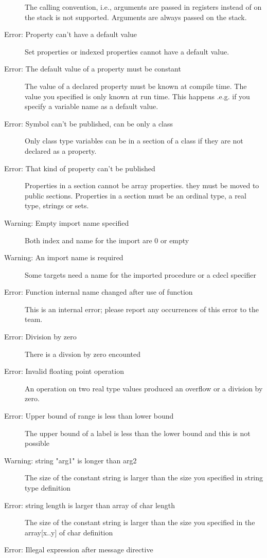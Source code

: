 \begin{description}
 The  calling convention, i.e., arguments are passed in
 registers instead of on the stack is not supported. Arguments are always
 passed on the stack.
\item [Error: Property can't have a default value]
 Set properties or indexed properties cannot have a default value.
\item [Error: The default value of a property must be constant]
 The value of a  declared property must be known at compile
 time. The value you specified is only known at run time. This happens
 .e.g. if you specify a variable name as a default value.
\item [Error: Symbol can't be published, can be only a class]
 Only class type variables can be in a  section of a class
 if they are not declared as a property.
\item [Error: That kind of property can't be published]
 Properties in a  section cannot be array properties.
 they must be moved to public sections. Properties in a 
 section must be an ordinal type, a real type, strings or sets.
\item [Warning: Empty import name specified]
 Both index and name for the import are 0 or empty
\item [Warning: An import name is required]
 Some targets need a name for the imported procedure or a cdecl specifier
\item [Error: Function internal name changed after use of function]
 This is an internal error; please report any occurrences of this error
 to the \fpc team.
\item [Error: Division by zero]
 There is a divsion by zero encounted
\item [Error: Invalid floating point operation]
 An operation on two real type values produced an overflow or a division
 by zero.
\item [Error: Upper bound of range is less than lower bound]
 The upper bound of a  label is less than the lower bound and this
 is not possible
\item [Warning: string "arg1" is longer than arg2]
 The size of the constant string is larger than the size you specified in
 string type definition
\item [Error: string length is larger than array of char length]
 The size of the constant string is larger than the size you specified in
 the array[x..y] of char definition
\item [Error: Illegal expression after message directive]

\end{description}
